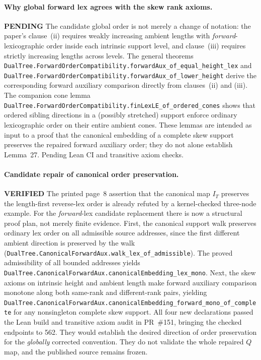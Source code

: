 \documentclass[11pt]{article}
\newcommand{\ok}{\textcolor{green!40!black}{\textbf{VERIFIED}}}
\newcommand{\todo}{\textcolor{gray!70!black}{\textbf{PENDING}}}
\newcommand{\lean}[1]{\texttt{#1}}
\begin{document}
\paragraph{Why global forward lex agrees with the skew rank axioms.} \todo
The candidate global order is not merely a change of
notation: the paper's clause~(ii) requires weakly increasing
ambient lengths with \emph{forward}-lexicographic order
inside each intrinsic support level, and clause~(iii)
requires strictly increasing lengths across levels.
The general theorems
\lean{DualTree.ForwardOrderCompatibility.forwardAux_of_equal_height_lex}
and
\lean{DualTree.ForwardOrderCompatibility.forwardAux_of_lower_height}
derive the corresponding forward auxiliary comparison
directly from clauses~(ii) and (iii).
The companion cone lemma
\lean{DualTree.ForwardOrderCompatibility.finLexLE_of_ordered_cones}
shows that ordered sibling directions in a (possibly
stretched) support enforce ordinary lexicographic
order on their entire ambient cones.
These lemmas are intended as input to a proof that the
canonical embedding of a complete skew support preserves
the repaired forward auxiliary order; they do not alone
establish Lemma~27. Pending Lean CI and transitive axiom checks.

\paragraph{Candidate repair of canonical order preservation.} \ok
The printed page~8 assertion that the canonical map $I_T$
preserves the length-first reverse-lex order is already
refuted by a kernel-checked three-node example.
For the \emph{forward}-lex candidate replacement there
is now a structural proof plan, not merely finite evidence.
First, the canonical support walk preserves ordinary lex
order on all admissible source addresses, since the first
different ambient direction is preserved by the walk
(\lean{DualTree.CanonicalForwardAux.walk_lex_of_admissible}).
The proved admissibility of all bounded addresses yields
\lean{DualTree.CanonicalForwardAux.canonicalEmbedding_lex_mono}.
Next, the skew axioms on intrinsic height and ambient
length make forward auxiliary comparison monotone along
both same-rank and different-rank pairs, yielding
\lean{DualTree.CanonicalForwardAux.canonicalEmbedding_forward_mono_of_complete}
for any nonsingleton complete skew support. All four new declarations passed the Lean build and transitive
axiom audit in PR~\#151, bringing the checked endpoints to 562.
They would establish the desired direction of order
preservation for the \emph{globally} corrected convention.
They do not validate the whole repaired $Q$ map, and
the published source remains frozen.
\end{document}
